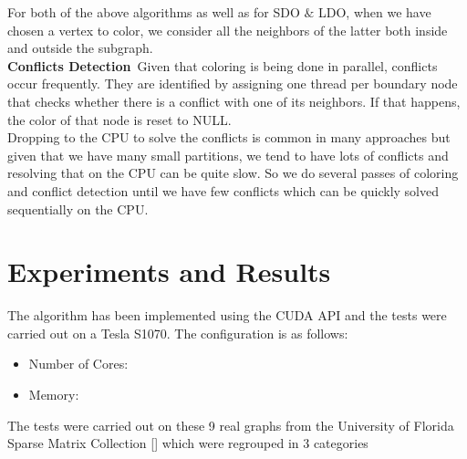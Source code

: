 \documentclass[preprint]{sigplanconf}
\begin{document}
For both of the above algorithms as well as for SDO $\&$ LDO, when we have chosen a vertex to color, we consider all the neighbors of the latter both inside and outside the subgraph.\\

\textbf{Conflicts Detection}\
Given that coloring is being done in parallel, conflicts occur frequently. They are identified by assigning one thread per boundary node that checks whether there is a conflict with one of its neighbors. If that happens, the color of that node is reset to NULL.\\

Dropping to the CPU to solve the conflicts is common in many approaches but given that we have many small partitions, we tend to have lots of conflicts and resolving that on the CPU can be quite slow. So we do several passes of coloring and conflict detection until we have few conflicts which can be quickly solved sequentially on the CPU. 


\section{Experiments and Results}
The algorithm has been implemented using the CUDA API and the tests were carried out on a Tesla S1070. The configuration is as follows:
\begin{itemize}
  \item Number of Cores:
  \item Memory:
\end{itemize}


The tests were carried out on these 9 real graphs from the University of Florida Sparse Matrix Collection [] which were regrouped in 3 categories
\end{document}

